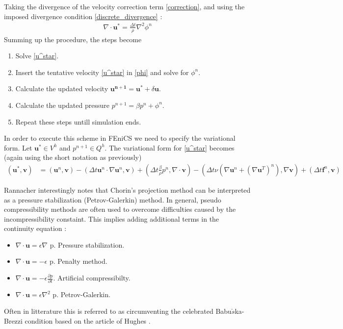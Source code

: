 \documentclass[11pt]{article}
\begin{document}
{Taking the divergence of the velocity correction term \eqref{correction}, and using the imposed
divergence condition \eqref{discrete_divergence} :
\begin{align}
\label{phi}
\nabla\cdot\mathbf{u^*} = \frac{\Delta t}{\rho} \nabla^2 \phi^n
\end{align}
Summing up the procedure, the steps become
\begin{enumerate}
\item Solve \eqref{u^star}.
\item Insert the tentative velocity \eqref{u^star} in \eqref{phi} and solve for $\phi^n$.
\item Calculate the updated velocity $\mathbf{u^{n+1}} = \mathbf{u^*} + \delta \mathbf{u}$.
\item Calculate the updated pressure $p^{n+1} = \beta p^n + \phi^n$.
\item Repeat these steps untill simulation ends.
\end{enumerate}
\vspace{1mm}
In order to execute this scheme in FEniCS we need to specify the variational form. 
Let $\mathbf{u}^* \in V^h$ and $p^{n+1}\in Q^h$. The variational form for 
\eqref{u^star} becomes (again using the short notation as previously)
\begin{align}
\label{u_star_weak}
(\mathbf{u}^*, \mathbf{v}) &= (\mathbf{u}^n,\mathbf{v}) 
- (\Delta t \mathbf{u}^n\cdot\nabla \mathbf{u}^n , \mathbf{v}) 
+ (\Delta t\frac{\beta}{\rho} p^n, \nabla \cdot \mathbf{v}) 
- (\Delta t \nu(\nabla\mathbf{u}^n + (\nabla\mathbf{u}^T)^{n}), \nabla \mathbf{v})   
+ (\Delta t\mathbf{f}^n, \mathbf{v})
\end{align}

\vspace{1mm}
Rannacher \cite{9}  interestingly notes that Chorin's projection method can be interpreted
as a pressure stabilization (Petrov-Galerkin) method. In general, pseudo compressibility
methods are often used to overcome difficulties caused by the incompressibility constaint.
This implies adding additional terms in the continuity equation :
\begin{itemize}
\item $\nabla\cdot\mathbf{u} = \epsilon\nabla$ p. \hspace{1mm}Pressure stabilization.
\item $\nabla\cdot\mathbf{u} = -\epsilon$ p. \hspace{1.5mm}Penalty method.
\item $\nabla\cdot\mathbf{u} = -\epsilon \frac{\partial p}{\partial t}$. \hspace{0.5mm}Artificial compressibilty.
\item $\nabla\cdot\mathbf{u} = \epsilon \nabla^2$ p. Petrov-Galerkin.
\end{itemize}
Often in litterature this is referred to as circumventing the celebrated Babu$\check{s}$ka-Brezzi 
condition based on the article of Hughes \cite{5}.  \\


}
\end{document}
